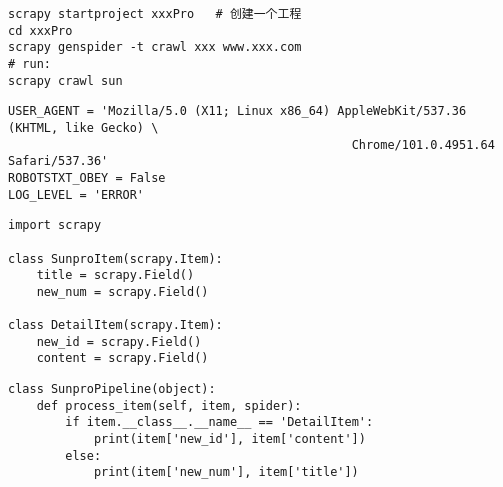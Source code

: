 \documentclass[a4paper,11pt]{ctexart}    %
\begin{document}
\begin{tcolorbox}[
         colback=red!5!white,
         colframe=teal,
         title=\textbf{bash}
    ]
\begin{verbatim}
scrapy startproject xxxPro   # 创建一个工程
cd xxxPro
scrapy genspider -t crawl xxx www.xxx.com
# run:
scrapy crawl sun
\end{verbatim}
\end{tcolorbox}

\begin{tcolorbox}[
         colback=red!5!white,
         colframe=teal,
         title=\textbf{settings.py}
    ]
\begin{verbatim}
USER_AGENT = 'Mozilla/5.0 (X11; Linux x86_64) AppleWebKit/537.36 (KHTML, like Gecko) \
                                                Chrome/101.0.4951.64 Safari/537.36'
ROBOTSTXT_OBEY = False
LOG_LEVEL = 'ERROR'
\end{verbatim}
\end{tcolorbox}

\begin{tcolorbox}[
         colback=red!5!white,
         colframe=teal,
         title=\textbf{items.py}
    ]
\begin{verbatim}
import scrapy

class SunproItem(scrapy.Item):
    title = scrapy.Field()
    new_num = scrapy.Field()

class DetailItem(scrapy.Item):
    new_id = scrapy.Field()
    content = scrapy.Field()
\end{verbatim}
\end{tcolorbox}

\begin{tcolorbox}[
         colback=red!5!white,
         colframe=teal,
         title=\textbf{pipelines.py}
    ]
\begin{verbatim}
class SunproPipeline(object):
    def process_item(self, item, spider):
        if item.__class__.__name__ == 'DetailItem':
            print(item['new_id'], item['content'])
        else:
            print(item['new_num'], item['title'])
\end{verbatim}
\end{tcolorbox}
\end{document}
